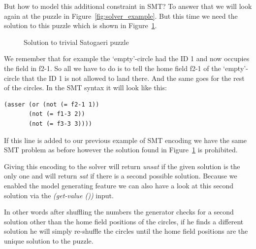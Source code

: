 But how to model this additional constraint in SMT? To answer that we will look again at the puzzle in Figure~\ref{fig:solver_example}. But this time we need the solution to this puzzle which is shown in Figure~\ref{fig:solver_example_solution}.
\begin{figure}
  \centering
  \caption{Solution to trivial Satogaeri puzzle}
  \label{fig:solver_example_solution}
\end{figure}
We remember that for example the `empty'-circle had the ID 1 and now occupies the field in f2-1. So all we have to do is to tell the home field f2-1 of the `empty'-circle that the ID 1 is not allowed to land there. And the same goes for the rest of the circles. In the SMT syntax it will look like this:
\begin{lstlisting}
(asser (or (not (= f2-1 1)) 
	   (not (= f1-3 2)) 
	   (not (= f3-3 3))))
\end{lstlisting}
If this line is added to our previous example of SMT encoding we have the same SMT problem as before however the solution found in Figure~\ref{fig:solver_example_solution} is prohibited.

Giving this encoding to the solver will return \emph{unsat} if the given solution is the only one and will return \emph{sat} if there is a second possible solution. Because we enabled the model generating feature we can also have a look at this second solution via the \emph{(get-value ())} input.

In other words after shuffling the numbers the generator checks for a second solution other than the home field positions of the circles, if he finds a different solution he will simply re-shuffle the circles until the home field positions are the unique solution to the puzzle.

